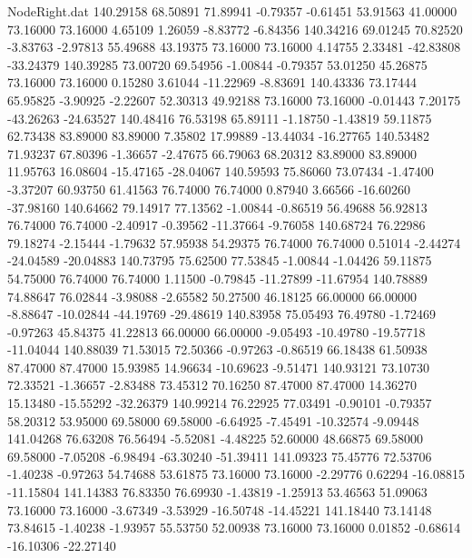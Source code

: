 \begin{filecontents}{NodeRight.dat}
 140.29158   68.50891   71.89941    -0.79357   -0.61451   53.91563   41.00000   73.16000   73.16000    4.65109    1.26059   -8.83772   -6.84356
 140.34216   69.01245   70.82520    -3.83763   -2.97813   55.49688   43.19375   73.16000   73.16000    4.14755    2.33481  -42.83808  -33.24379
 140.39285   73.00720   69.54956    -1.00844   -0.79357   53.01250   45.26875   73.16000   73.16000    0.15280    3.61044  -11.22969   -8.83691
 140.43336   73.17444   65.95825    -3.90925   -2.22607   52.30313   49.92188   73.16000   73.16000   -0.01443    7.20175  -43.26263  -24.63527
 140.48416   76.53198   65.89111    -1.18750   -1.43819   59.11875   62.73438   83.89000   83.89000    7.35802   17.99889  -13.44034  -16.27765
 140.53482   71.93237   67.80396    -1.36657   -2.47675   66.79063   68.20312   83.89000   83.89000   11.95763   16.08604  -15.47165  -28.04067
 140.59593   75.86060   73.07434    -1.47400   -3.37207   60.93750   61.41563   76.74000   76.74000    0.87940    3.66566  -16.60260  -37.98160
 140.64662   79.14917   77.13562    -1.00844   -0.86519   56.49688   56.92813   76.74000   76.74000   -2.40917   -0.39562  -11.37664   -9.76058
 140.68724   76.22986   79.18274    -2.15444   -1.79632   57.95938   54.29375   76.74000   76.74000    0.51014   -2.44274  -24.04589  -20.04883
 140.73795   75.62500   77.53845    -1.00844   -1.04426   59.11875   54.75000   76.74000   76.74000    1.11500   -0.79845  -11.27899  -11.67954
 140.78889   74.88647   76.02844    -3.98088   -2.65582   50.27500   46.18125   66.00000   66.00000   -8.88647  -10.02844  -44.19769  -29.48619
 140.83958   75.05493   76.49780    -1.72469   -0.97263   45.84375   41.22813   66.00000   66.00000   -9.05493  -10.49780  -19.57718  -11.04044
 140.88039   71.53015   72.50366    -0.97263   -0.86519   66.18438   61.50938   87.47000   87.47000   15.93985   14.96634  -10.69623   -9.51471
 140.93121   73.10730   72.33521    -1.36657   -2.83488   73.45312   70.16250   87.47000   87.47000   14.36270   15.13480  -15.55292  -32.26379
 140.99214   76.22925   77.03491    -0.90101   -0.79357   58.20312   53.95000   69.58000   69.58000   -6.64925   -7.45491  -10.32574   -9.09448
 141.04268   76.63208   76.56494    -5.52081   -4.48225   52.60000   48.66875   69.58000   69.58000   -7.05208   -6.98494  -63.30240  -51.39411
 141.09323   75.45776   72.53706    -1.40238   -0.97263   54.74688   53.61875   73.16000   73.16000   -2.29776    0.62294  -16.08815  -11.15804
 141.14383   76.83350   76.69930    -1.43819   -1.25913   53.46563   51.09063   73.16000   73.16000   -3.67349   -3.53929  -16.50748  -14.45221
 141.18440   73.14148   73.84615    -1.40238   -1.93957   55.53750   52.00938   73.16000   73.16000    0.01852   -0.68614  -16.10306  -22.27140

\end{filecontents}
